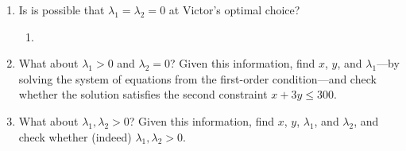 \documentclass[11pt]{article}
\begin{document}
\begin{enumerate}
\begin{enumerate}
        \item Is is possible that $\lambda_{1}=\lambda_{2}=0$ at Victor's optimal choice?

            \begin{enumerate}
                \item 
            \end{enumerate}

        \item What about $\lambda_{1}>0$ and $\lambda_{2}=0$? Given this information, find $x$, $y$, and $\lambda_{1}$---by solving the system of equations from the first-order condition---and check whether the solution satisfies the second constraint $x+3y\leq 300$.

        \item What about $\lambda_{1},\lambda_{2}>0$? Given this information, find $x$, $y$, $\lambda_{1}$, and $\lambda_{2}$, and check whether (indeed) $\lambda_{1},\lambda_{2}>0$.
    \end{enumerate}


\end{enumerate}
\end{document}
